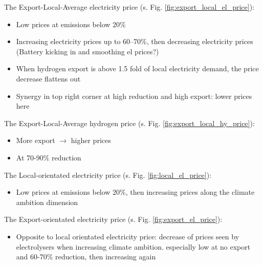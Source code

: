 The Export-Local-Average electricity price (s. Fig. \ref{fig:export_local_el_price}):
\begin{itemize}
    \item Low prices at emissions below 20\%
    \item Increasing electricity prices up to $60$--$70$\%, then decreasing electricity prices (Battery kicking in and smoothing el prices?)
    \item When hydrogen export is above 1.5 fold of local electricity demand, the price decrease flattens out
    \item Synergy in top right corner at high reduction and high export: lower prices here 
\end{itemize}

The Export-Local-Average hydrogen price (s. Fig. \ref{fig:export_local_hy_price}):
\begin{itemize}
    \item More export $\rightarrow$ higher prices
    \item At 70-90\% reduction
\end{itemize}

The Local-orientated electricity price (s. Fig. \ref{fig:local_el_price}):
\begin{itemize}
    \item Low prices at emissions below 20\%, then increasing prices along the climate ambition dimension
\end{itemize}

The Export-orientated electricity price (s. Fig. \ref{fig:export_el_price}):
\begin{itemize}
    \item Opposite to local orientated electricity price: decrease of prices seen by electrolysers when increasing climate ambition. especially low at no export and 60-70\% reduction, then increasing again
\end{itemize}


